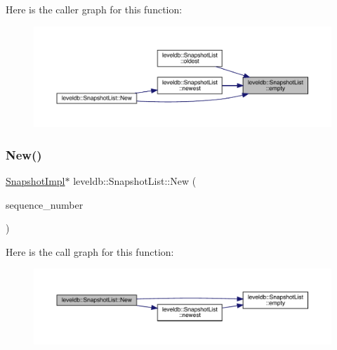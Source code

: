Here is the caller graph for this function\+:
\nopagebreak
\begin{figure}[H]
\begin{center}
\leavevmode
\includegraphics[width=350pt]{classleveldb_1_1_snapshot_list_a1db6b1cbcd79669168052e088e8af84e_icgraph}
\end{center}
\end{figure}
\mbox{\label{classleveldb_1_1_snapshot_list_a40ede9e24ef1c4f0544beb44b48f252e}} 
\subsubsection{\texorpdfstring{New()}{New()}}
{\footnotesize\ttfamily \mbox{\hyperlink{classleveldb_1_1_snapshot_impl}{Snapshot\+Impl}}$\ast$ leveldb\+::\+Snapshot\+List\+::\+New (\begin{DoxyParamCaption}\item[{\mbox{\hyperlink{namespaceleveldb_a5481ededd221c36d652c371249f869fa}{Sequence\+Number}}}]{sequence\+\_\+number }\end{DoxyParamCaption})\hspace{0.3cm}{\ttfamily [inline]}}

Here is the call graph for this function\+:
\nopagebreak
\begin{figure}[H]
\begin{center}
\leavevmode
\includegraphics[width=350pt]{classleveldb_1_1_snapshot_list_a40ede9e24ef1c4f0544beb44b48f252e_cgraph}
\end{center}
\end{figure}
\mbox{\label{classleveldb_1_1_snapshot_list_ae4480f4d9059d78623773b7e87aad11b}} 
